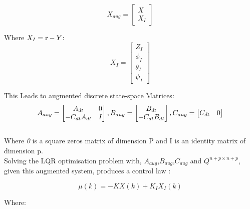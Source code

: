 \documentclass[12pt,a4paper,twoside]{report}
\begin{document}
				\begin{equation}
					X_{aug} = 
					\begin{bmatrix}
						X \\
						X_I
					\end{bmatrix}
				\end{equation}
				
				Where 	\(X_I = \emph{\emph{r}} - Y \):
				\begin{equation}
					X_I =
					\begin{bmatrix}
						Z_I \\
						\phi_I\\
						\theta_I\\
						\psi_I
					\end{bmatrix}
				\end{equation}
				
				This Leads to augmented discrete state-space Matrices:
				\\
				\begin{equation}
					A_{aug} =
					\begin{bmatrix}
						A_{dt} & \emph{\emph{0}} \\
						-C_{dt}A_{dt} & I
					\end{bmatrix}
					,
					B_{aug} =
					\begin{bmatrix}
						B_{dt}\\
						-C_{dt}B_{dt}
					\end{bmatrix}
					,
					C_{aug} =
					\begin{bmatrix}
						C_{dt} & \emph{\emph{0}}
					\end{bmatrix}
				\end{equation}
				\\   
				Where \emph{\emph{0}} is a square zeros matrix of dimension P and I is an identity matrix of dimension p.
				\\
				Solving the LQR optimisation problem with, $A_{aug}$,$B_{aug}$,$C_{aug}$ and $Q^{n+p \times n+p}$, given this augmented system, produces a control law \cite{19}: 
				
				\begin{equation}
					\mu(k) = - K X(k) + K_I X_I(k)
				\end{equation}
				
				Where:
				
\end{document}
